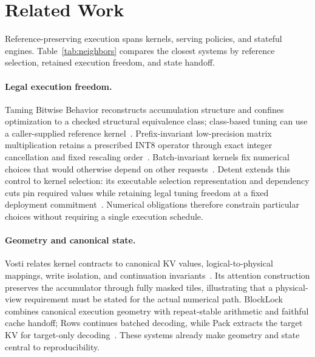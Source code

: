 \section{Related Work}
\label{sec:related}

Reference-preserving execution spans kernels, serving policies, and stateful engines. Table~\ref{tab:neighbors} compares the closest systems by reference selection, retained execution freedom, and state handoff.


\paragraph{Legal execution freedom.}
Taming Bitwise Behavior reconstructs accumulation structure and confines optimization to a checked structural equivalence class; class-based tuning can use a caller-supplied reference kernel~\cite{taming}. Prefix-invariant low-precision matrix multiplication retains a prescribed INT8 operator through exact integer cancellation and fixed rescaling order~\cite{beyondaccuracy}. Batch-invariant kernels fix numerical choices that would otherwise depend on other requests~\cite{thinkingmachines}. Detent extends this control to kernel selection: its executable selection representation and dependency cuts pin required values while retaining legal tuning freedom at a fixed deployment commitment~\cite{detent}. Numerical obligations therefore constrain particular choices without requiring a single execution schedule.

\paragraph{Geometry and canonical state.}
Vosti relates kernel contracts to canonical KV values, logical-to-physical mappings, write isolation, and continuation invariants~\cite{vosti}. Its attention construction preserves the accumulator through fully masked tiles, illustrating that a physical-view requirement must be stated for the actual numerical path. BlockLock combines canonical execution geometry with repeat-stable arithmetic and faithful cache handoff; Rows continues batched decoding, while Pack extracts the target KV for target-only decoding~\cite{blocklock}. These systems already make geometry and state central to reproducibility.

